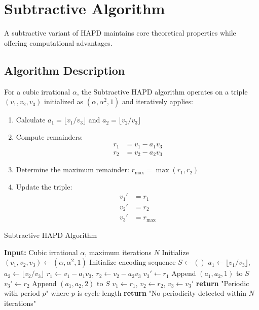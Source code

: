 \section{Subtractive Algorithm}\label{sec:subtractive_algorithm}

A subtractive variant of HAPD maintains core theoretical properties while offering computational advantages.

\subsection{Algorithm Description}

\begin{definition}\label{def:subtractive_hapd}
For a cubic irrational $\alpha$, the Subtractive HAPD algorithm operates on a triple $(v_1, v_2, v_3)$ initialized as $(\alpha, \alpha^2, 1)$ and iteratively applies:

\begin{enumerate}
    \item Calculate $a_1 = \lfloor v_1/v_3 \rfloor$ and $a_2 = \lfloor v_2/v_3 \rfloor$
    \item Compute remainders: 
    \begin{align}
        r_1 &= v_1 - a_1v_3 \\
        r_2 &= v_2 - a_2v_3
    \end{align}
    \item Determine the maximum remainder: $r_{\text{max}} = \max(r_1, r_2)$
    \item Update the triple:
    \begin{align}
        v_1' &= r_1 \\
        v_2' &= r_2 \\
        v_3' &= r_{\text{max}}
    \end{align}
\end{enumerate}
\end{definition}

\begin{algorithm}[H]
\caption{Subtractive HAPD Algorithm}\label{alg:subtractive_hapd}
\begin{algorithmic}[1]
\State \textbf{Input:} Cubic irrational $\alpha$, maximum iterations $N$
\State Initialize $(v_1, v_2, v_3) \gets (\alpha, \alpha^2, 1)$
\State Initialize encoding sequence $S \gets ()$
    \State $a_1 \gets \lfloor v_1/v_3 \rfloor$, $a_2 \gets \lfloor v_2/v_3 \rfloor$
    \State $r_1 \gets v_1 - a_1v_3$, $r_2 \gets v_2 - a_2v_3$
        \State $v_3' \gets r_1$
        \State Append $(a_1, a_2, 1)$ to $S$
    \Else
        \State $v_3' \gets r_2$
        \State Append $(a_1, a_2, 2)$ to $S$
    \EndIf
    \State $v_1 \gets r_1$, $v_2 \gets r_2$, $v_3 \gets v_3'$
        \State \textbf{return} "Periodic with period $p$" where $p$ is cycle length
    \EndIf
\EndFor
\State \textbf{return} "No periodicity detected within $N$ iterations"
\end{algorithmic}
\end{algorithm}

